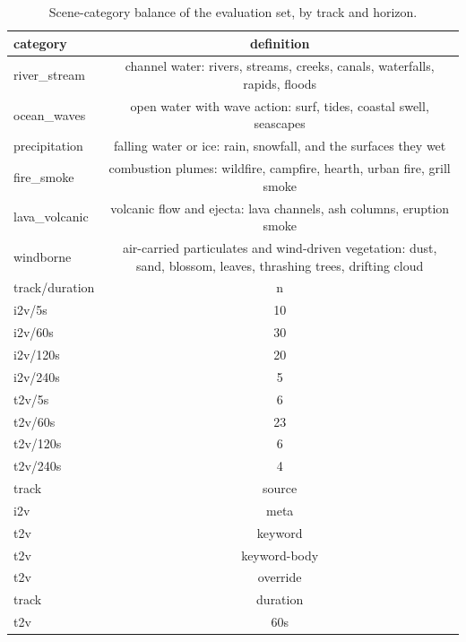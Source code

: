 \begin{table}[tb]
\centering
\scriptsize
\setlength{\tabcolsep}{5pt}
\begin{tabular}{lc}
\toprule
category & definition \\
\midrule
river\_stream & channel water: rivers, streams, creeks, canals, waterfalls, rapids, floods \\
ocean\_waves & open water with wave action: surf, tides, coastal swell, seascapes \\
precipitation & falling water or ice: rain, snowfall, and the surfaces they wet \\
fire\_smoke & combustion plumes: wildfire, campfire, hearth, urban fire, grill smoke \\
lava\_volcanic & volcanic flow and ejecta: lava channels, ash columns, eruption smoke \\
windborne & air-carried particulates and wind-driven vegetation: dust, sand, blossom, leaves, thrashing trees, drifting cloud \\
track/duration & n \\
i2v/5s & 10 \\
i2v/60s & 30 \\
i2v/120s & 20 \\
i2v/240s & 5 \\
t2v/5s & 6 \\
t2v/60s & 23 \\
t2v/120s & 6 \\
t2v/240s & 4 \\
track & source \\
i2v & meta \\
t2v & keyword \\
t2v & keyword-body \\
t2v & override \\
track & duration \\
t2v & 60s \\
\bottomrule
\end{tabular}
\caption{Scene-category balance of the evaluation set, by track and horizon.}
\label{tab:category}
\end{table}